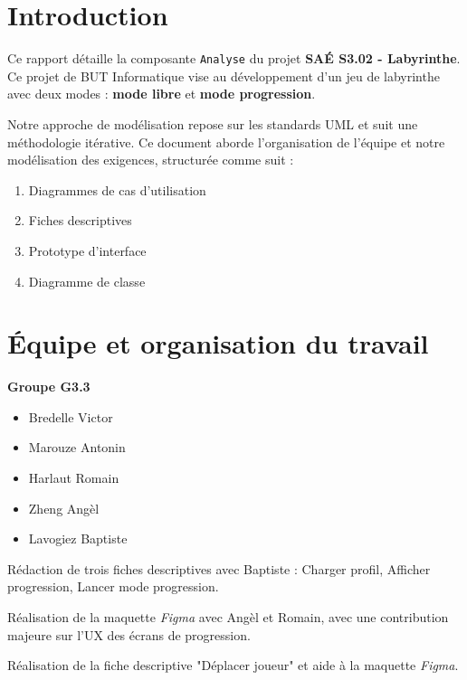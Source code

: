 \documentclass{butexFR}
\begin{document}
\fairepagedegarde
\fairemarges
\tabledematieres



\section{Introduction}

Ce rapport détaille la composante \texttt{Analyse} du projet \textbf{SAÉ S3.02 - Labyrinthe}. Ce projet de BUT Informatique vise au développement d'un jeu de labyrinthe avec deux modes : \textbf{mode libre} et \textbf{mode progression}.

Notre approche de modélisation repose sur les standards UML et suit une méthodologie itérative. Ce document aborde l'organisation de l'équipe et notre modélisation des exigences, structurée comme suit :

\begin{enumerate}
    \item Diagrammes de cas d'utilisation
    \item Fiches descriptives
    \item Prototype d'interface
    \item Diagramme de classe
\end{enumerate}

\section{Équipe et organisation du travail}
\textbf{Groupe G3.3}

\begin{itemize}
    \item Bredelle Victor
    \item Marouze Antonin
    \item Harlaut Romain
    \item Zheng Angèl
    \item Lavogiez Baptiste
\end{itemize}


Rédaction de trois fiches descriptives avec Baptiste : Charger profil, Afficher progression, Lancer mode progression.


Réalisation de la maquette \textit{Figma} avec Angèl et Romain, avec une contribution majeure sur l'UX des écrans de progression.


Réalisation de la fiche descriptive "Déplacer joueur" et aide à la maquette \textit{Figma}.
\end{document}
